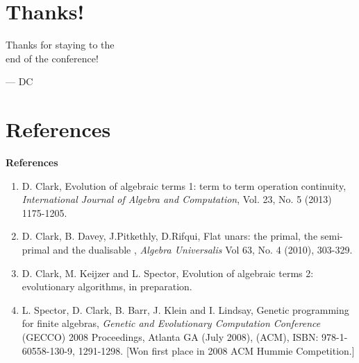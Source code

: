 \documentclass{beamer}
\begin{document}
\section{Thanks!}

\begin{frame}

\vspace{1.5cm} \it

\hspace{2cm}\parbox{8cm}{\LARGE Thanks for staying to the\\ end of the conference! \bigskip

\hspace{4cm} --- DC}

\end{frame}



\section{References}

\begin{frame}
\textbf{References}
\begin{enumerate}

\item D. Clark, Evolution of algebraic terms 1:  term to term operation continuity, \textit{International Journal of Algebra and Computation}, Vol. 23, No. 5 (2013) 1175-1205.

\item D. Clark, B. Davey, J.Pitkethly, D.Rifqui, Flat unars:  the primal, the semi-primal and the dualisable , \textit{Algebra Universalis} Vol 63, No. 4 (2010), 303-329.

\item D. Clark, M. Keijzer and L. Spector, Evolution of algebraic terms 2:  evolutionary algorithms,  in preparation. 

   \item  L. Spector, D. Clark, B. Barr, J. Klein and I. Lindsay, Genetic programming for finite algebras, \emph{Genetic and Evolutionary Computation Conference} (GECCO) 2008 Proceedings, Atlanta GA (July 2008), (ACM), ISBN: 978-1-60558-130-9, 1291-1298.  [Won first place in 2008 ACM Hummie Competition.] 


\end{enumerate}
\end{frame}

\end{document}
